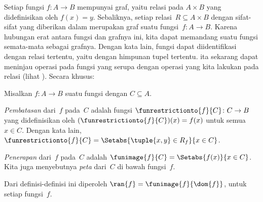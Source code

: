 \documentclass[../../../include/open-logic-section]{subfiles}
\begin{document}
\begin{explain}
Setiap fungsi $f\colon A \to B$ mempunyai graf, yaitu relasi pada $A \times B$
yang didefinisikan oleh $f(x) = y$. Sebaliknya, setiap relasi~$R \subseteq A
\times B$ dengan sifat-sifat yang diberikan dalam
 merupakan graf suatu fungsi~$f \colon A \to B$.
Karena hubungan erat antara fungsi dan grafnya ini, kita dapat memandang suatu
fungsi semata-mata sebagai grafnya. Dengan kata lain, fungsi dapat
diidentifikasi dengan relasi tertentu, yaitu dengan himpunan tupel tertentu.
ita sekarang dapat meninjau
operasi pada fungsi yang serupa dengan operasi yang kita lakukan pada relasi
(lihat ). Secara khusus:
\end{explain}

\begin{defn}
Misalkan $f \colon A \to B$ suatu fungsi dengan $C\subseteq A$.

\emph{Pembatasan} dari~$f$ pada~$C$ adalah fungsi
$\funrestrictionto{f}{C}\colon C \to B$ yang didefinisikan oleh
$(\funrestrictionto{f}{C})(x) = f(x)$ untuk semua $x \in C$. Dengan kata lain,
$\funrestrictionto{f}{C} = \Setabs{\tuple{x, y} \in R_f}{x \in C}$.

\emph{Penerapan} dari~$f$ pada~$C$ adalah $\funimage{f}{C} =
\Setabs{f(x)}{x \in C}$. Kita juga menyebutnya \emph{peta} dari~$C$ di bawah
fungsi~$f$.
\end{defn}

\begin{explain}
Dari definisi-definisi ini diperoleh $\ran{f} =
\funimage{f}{\dom{f}}$, untuk setiap fungsi~$f$.
\end{explain}
\end{document}
